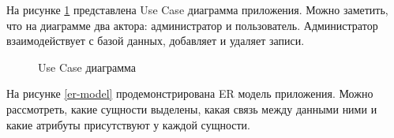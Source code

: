 \documentclass[a4paper, 14pt]{article}
\begin{document}
	На рисунке \ref{use-case} представлена Use Case диаграмма приложения. Можно заметить, что на диаграмме два актора: администратор и пользователь. Администратор взаимодействует с базой данных, добавляет и удаляет записи.
	
	\begin{figure}[h!]
		\caption{Use Case диаграмма}
		\label{use-case}
	\end{figure}

	\newpage
	На рисунке \ref{er-model} продемонстрирована ER модель приложения. Можно рассмотреть, какие сущности выделены, какая связь между данными ними и какие атрибуты присутствуют у каждой сущности.
\end{document}

